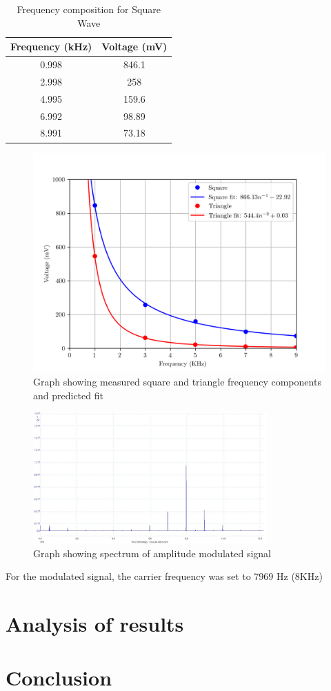 \documentclass[12pt]{article}
\begin{document}
\begin{table}[h]
    \centering
    \caption{Frequency composition for Square Wave}
    \begin{tabular}{|c|c|}
    \hline
    Frequency (kHz) & Voltage (mV) \\ \hline
    0.998           & 846.1        \\
    2.998           & 258          \\
    4.995           & 159.6        \\
    6.992           & 98.89        \\
    8.991           & 73.18        \\ \hline
    \end{tabular}
\end{table}

\begin{figure}[h]
    \centering
    \includegraphics[width=1\textwidth]{square_triangle.png}
    \caption{Graph showing measured square and triangle frequency components and predicted fit}
    \label{fig:square_triangle}
\end{figure}

\begin{figure}[h]
    \centering
    \includegraphics[width=0.8\textwidth]{AmpMod_f.jpg}
    \caption{Graph showing spectrum of amplitude modulated signal}
    \label{fig:freq_responses}
\end{figure}

For the modulated signal, the carrier frequency was set to $7969$ Hz (8KHz) 



\section{Analysis of results}




\section{Conclusion}
\end{document}
